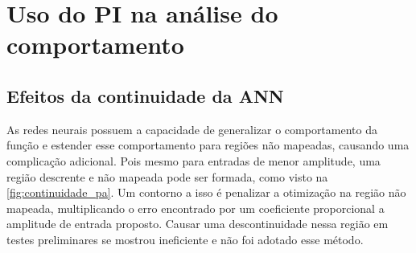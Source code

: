 
\section{Uso do PI na análise do comportamento} \label{sec:estudoi-pi}

\subsection{Efeitos da continuidade da ANN} \label{subsec:estudoi-pi-conti}
As redes neurais possuem a capacidade de generalizar o comportamento da função e estender esse comportamento para regiões não mapeadas, causando uma complicação adicional. Pois mesmo para entradas de menor amplitude, uma região descrente e não mapeada pode ser formada, como visto na \autoref{fig:continuidade_pa}. Um contorno a isso é penalizar a otimização na região não mapeada, multiplicando o erro encontrado por um coeficiente proporcional a amplitude de entrada proposto. Causar uma descontinuidade nessa região em testes preliminares se mostrou ineficiente e não foi adotado esse método.

